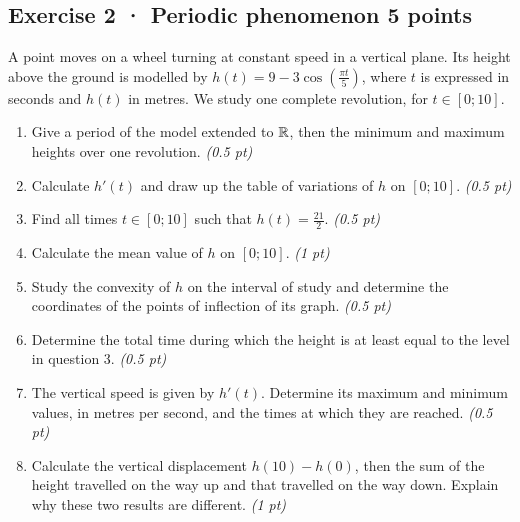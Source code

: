 \subsection*{Exercise 2 · Periodic phenomenon \hfill 5 points}A point moves on a wheel turning at constant speed in a vertical plane. Its height above the ground is modelled by $h(t)=9-3\cos\left(\frac{\pi t}{5}\right)$, where $t$ is expressed in seconds and $h(t)$ in metres. We study one complete revolution, for $t\in[0;10]$.

\begin{enumerate}

\item Give a period of the model extended to $\mathbb R$, then the minimum and maximum heights over one revolution. \hfill\textit{(0.5 pt)}

\item Calculate $h'(t)$ and draw up the table of variations of $h$ on $[0;10]$. \hfill\textit{(0.5 pt)}

\item Find all times $t\in[0;10]$ such that $h(t)=\frac{21}{2}$. \hfill\textit{(0.5 pt)}

\item Calculate the mean value of $h$ on $[0;10]$. \hfill\textit{(1 pt)}

\item Study the convexity of $h$ on the interval of study and determine the coordinates of the points of inflection of its graph. \hfill\textit{(0.5 pt)}

\item Determine the total time during which the height is at least equal to the level in question 3. \hfill\textit{(0.5 pt)}

\item The vertical speed is given by $h'(t)$. Determine its maximum and minimum values, in metres per second, and the times at which they are reached. \hfill\textit{(0.5 pt)}

\item Calculate the vertical displacement $h(10)-h(0)$, then the sum of the height travelled on the way up and that travelled on the way down. Explain why these two results are different. \hfill\textit{(1 pt)}

\end{enumerate}

\clearpage{}\par

